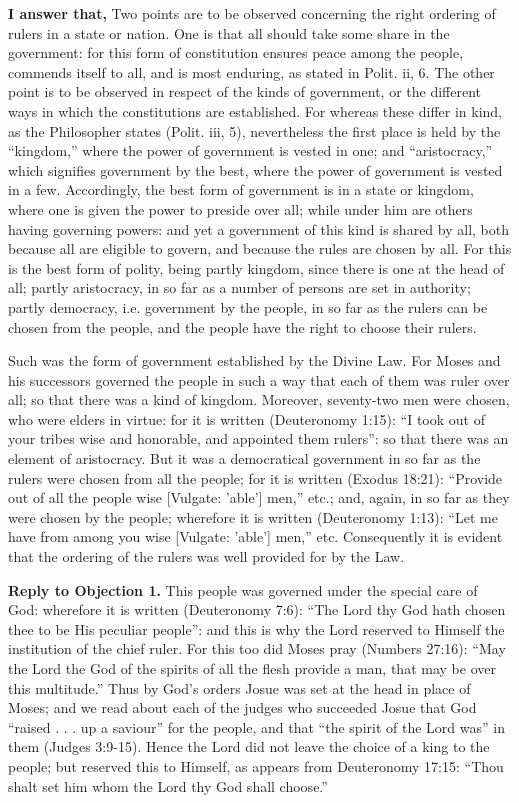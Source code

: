 \textbf{I answer that,} Two points are to be observed concerning the right ordering of rulers in a state or nation. One is that all should take some share in the government: for this form of constitution ensures peace among the people, commends itself to all, and is most enduring, as stated in Polit. ii, 6. The other point is to be observed in respect of the kinds of government, or the different ways in which the constitutions are established. For whereas these differ in kind, as the Philosopher states (Polit. iii, 5), nevertheless the first place is held by the ``kingdom,'' where the power of government is vested in one; and ``aristocracy,'' which signifies government by the best, where the power of government is vested in a few. Accordingly, the best form of government is in a state or kingdom, where one is given the power to preside over all; while under him are others having governing powers: and yet a government of this kind is shared by all, both because all are eligible to govern, and because the rules are chosen by all. For this is the best form of polity, being partly kingdom, since there is one at the head of all; partly aristocracy, in so far as a number of persons are set in authority; partly democracy, i.e. government by the people, in so far as the rulers can be chosen from the people, and the people have the right to choose their rulers.

Such was the form of government established by the Divine Law. For Moses and his successors governed the people in such a way that each of them was ruler over all; so that there was a kind of kingdom. Moreover, seventy-two men were chosen, who were elders in virtue: for it is written (Deuteronomy 1:15): ``I took out of your tribes wise and honorable, and appointed them rulers'': so that there was an element of aristocracy. But it was a democratical government in so far as the rulers were chosen from all the people; for it is written (Exodus 18:21): ``Provide out of all the people wise [Vulgate: 'able'] men,'' etc.; and, again, in so far as they were chosen by the people; wherefore it is written (Deuteronomy 1:13): ``Let me have from among you wise [Vulgate: 'able'] men,'' etc. Consequently it is evident that the ordering of the rulers was well provided for by the Law.

\textbf{Reply to Objection 1.} This people was governed under the special care of God: wherefore it is written (Deuteronomy 7:6): ``The Lord thy God hath chosen thee to be His peculiar people'': and this is why the Lord reserved to Himself the institution of the chief ruler. For this too did Moses pray (Numbers 27:16): ``May the Lord the God of the spirits of all the flesh provide a man, that may be over this multitude.'' Thus by God's orders Josue was set at the head in place of Moses; and we read about each of the judges who succeeded Josue that God ``raised . . . up a saviour'' for the people, and that ``the spirit of the Lord was'' in them (Judges 3:9-15). Hence the Lord did not leave the choice of a king to the people; but reserved this to Himself, as appears from Deuteronomy 17:15: ``Thou shalt set him whom the Lord thy God shall choose.''

